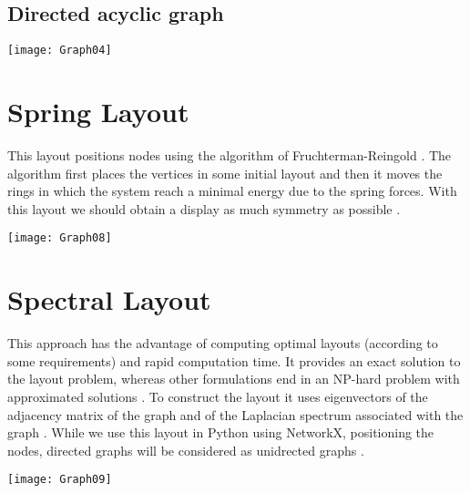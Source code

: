 \documentclass[10pt,a4paper,openany]{article}
\begin{document}
		\newpage

		\subsection*{Directed acyclic graph}
		
		
		
		\begin{center}
			\texttt{[image: Graph04]}
		\end{center}

\newpage

	\section*{Spring Layout}
	This layout positions nodes using the algorithm of Fruchterman-Reingold \citep{networkx}. The algorithm first places the vertices in some initial layout and then it moves the rings in which the system reach a minimal energy due to the spring forces. With this layout we should obtain a display as much symmetry as possible \citep{DBLP:journals/corr/abs-1201-3011}.
	
	
	
	\begin{center}
		\texttt{[image: Graph08]}
	\end{center}
	
\newpage
	
	\section*{Spectral Layout}
	This approach has the advantage of computing optimal layouts (according to some requirements) and rapid computation time. It provides an exact solution to the layout problem, whereas other formulations end in an NP-hard problem with approximated solutions \citep{koren2003spectral}. To construct the layout it uses eigenvectors of the adjacency matrix of the graph and of the Laplacian spectrum associated with the graph \citep{koren2003spectral}. While we use this layout in Python using NetworkX, positioning the nodes, directed graphs will be considered as unidrected graphs \citep{networkx}.
	
	
	
	\begin{center}
		\texttt{[image: Graph09]}
	\end{center}
	
\end{document}
